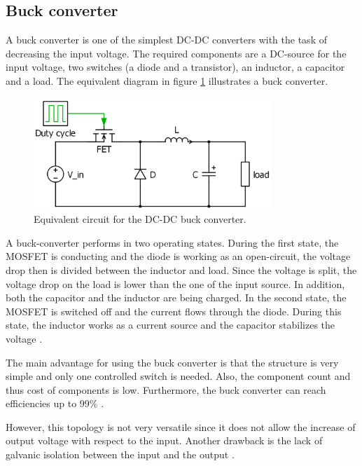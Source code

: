 \subsection{Buck converter\label{Buck-C}}

A buck converter is one of the simplest DC-DC converters with the task of decreasing the input voltage. The required components are a DC-source for the input voltage, two switches (a diode and a transistor), an inductor, a capacitor and a load. The equivalent diagram in figure \ref{Buck-converter} illustrates a buck converter. 

\begin{figure}[htbp]
	\begin{center}
		\includegraphics[width=0.8\textwidth]{../Pictures/Buck-converter}
		\caption{Equivalent circuit for the DC-DC buck converter.}
		\label{Buck-converter}
	\end{center}	
\end{figure}

A buck-converter performs in two operating states. 
During the first state, the MOSFET is conducting and the diode is working as an open-circuit, the voltage drop  then is divided between the inductor and load. Since the voltage is split, the voltage drop on the load is lower than the one of the input source. In addition, both the capacitor and the inductor are being charged. In the second state, the MOSFET is switched off and the current flows through the diode. During this state, the inductor works as a current source and the capacitor stabilizes the voltage \cite{schematicbuckandboost}.

The main advantage for using the buck converter is that the structure is very simple and only one controlled  switch is needed. Also, the component count and thus cost of components is low. Furthermore, the buck converter can reach efficiencies up to 99\% \cite{Efficiencybuck}. 

However, this topology is not very versatile since it does not allow the increase of output voltage with respect to the input. Another drawback is the lack of galvanic isolation between the input and the output \cite{advantagebuck}.

